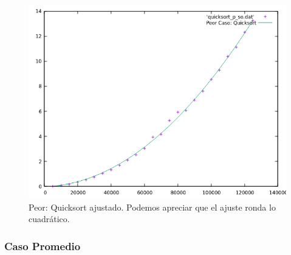 \documentclass[a4paper,12pt,twoside]{article} %
\begin{document}
\begin{itemize}
\begin{figure}[h]
\begin{center}
  	\includegraphics[scale=0.8]{quicksort_p_so_a.png}
  	\caption{Peor: Quicksort ajustado. Podemos apreciar que el ajuste ronda lo cuadrático.}
  	
  \end{center}
\end{figure}
		
	\end{itemize}


	
\newpage
	
	\subsubsection{Caso Promedio}
	
\end{document}
